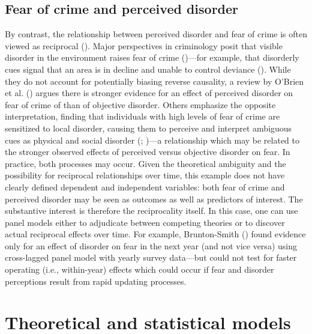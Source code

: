 \documentclass[
  letterpaper,
  DIV=11,
  numbers=noendperiod]{scrartcl}
\begin{document}
\subsection{Fear of crime and perceived
disorder}\label{fear-of-crime-and-perceived-disorder}

By contrast, the relationship between perceived disorder and fear of
crime is often viewed as reciprocal
(). Major
perspectives in criminology posit that visible disorder in the
environment raises fear of crime ()---for example, that disorderly cues signal that an area is in
decline and unable to control deviance
(). While they
do not account for potentially biasing reverse causality, a review by
O'Brien et al. () argues there is
stronger evidence for an effect of perceived disorder on fear of crime
of than of objective disorder. Others emphasize the opposite
interpretation, finding that individuals with high levels of fear of
crime are sensitized to local disorder, causing them to perceive and
interpret ambiguous cues as physical and social disorder
(;
)---a relationship
which may be related to the stronger observed effects of perceived
versus objective disorder on fear. In practice, both processes may
occur. Given the theoretical ambiguity and the possibility for
reciprocal relationships over time, this example does not have clearly
defined dependent and independent variables: both fear of crime and
perceived disorder may be seen as outcomes as well as predictors of
interest. The substantive interest is therefore the reciprocality
itself. In this case, one can use panel models either to adjudicate
between competing theories or to discover actual reciprocal effects over
time. For example, Brunton-Smith
() found evidence only for an
effect of disorder on fear in the next year (and not vice versa) using
cross-lagged panel model with yearly survey data---but could not test
for faster operating (i.e., within-year) effects which could occur if
fear and disorder perceptions result from rapid updating processes.

\section{Theoretical and statistical
models}\label{theoretical-and-statistical-models}
\end{document}
